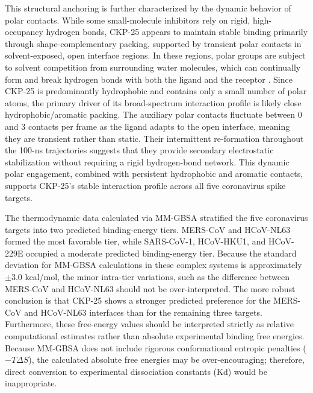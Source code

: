 \documentclass[pharmaceuticals,article,submit,pdftex,moreauthors]{Definitions/mdpi}
\begin{document}
This structural anchoring is further characterized by the dynamic behavior of polar contacts. While some small-molecule inhibitors rely on rigid, high-occupancy hydrogen bonds, CKP-25 appears to maintain stable binding primarily through shape-complementary packing, supported by transient polar contacts in solvent-exposed, open interface regions. In these regions, polar groups are subject to solvent competition from surrounding water molecules, which can continually form and break hydrogen bonds with both the ligand and the receptor \cite{ladbury1996effect, bissantz2010medicinal}. Since CKP-25 is predominantly hydrophobic and contains only a small number of polar atoms, the primary driver of its broad-spectrum interaction profile is likely close hydrophobic/aromatic packing. The auxiliary polar contacts fluctuate between 0 and 3 contacts per frame as the ligand adapts to the open interface, meaning they are transient rather than static. Their intermittent re-formation throughout the 100-ns trajectories suggests that they provide secondary electrostatic stabilization without requiring a rigid hydrogen-bond network. This dynamic polar engagement, combined with persistent hydrophobic and aromatic contacts, supports CKP-25’s stable interaction profile across all five coronavirus spike targets.

The thermodynamic data calculated via MM-GBSA stratified the five coronavirus targets into two predicted binding-energy tiers. MERS-CoV and HCoV-NL63 formed the most favorable tier, while SARS-CoV-1, HCoV-HKU1, and HCoV-229E occupied a moderate predicted binding-energy tier. Because the standard deviation for MM-GBSA calculations in these complex systems is approximately $\pm 3.0$ kcal/mol, the minor intra-tier variations, such as the difference between MERS-CoV and HCoV-NL63 should not be over-interpreted. The more robust conclusion is that CKP-25 shows a stronger predicted preference for the MERS-CoV and HCoV-NL63 interfaces than for the remaining three targets. Furthermore, these free-energy values should be interpreted strictly as relative computational estimates rather than absolute experimental binding free energies. Because MM-GBSA does not include rigorous conformational entropic penalties ($-T\Delta S$), the calculated absolute free energies may be over-encouraging; therefore, direct conversion to experimental dissociation constants (Kd) would be inappropriate.
\end{document}
